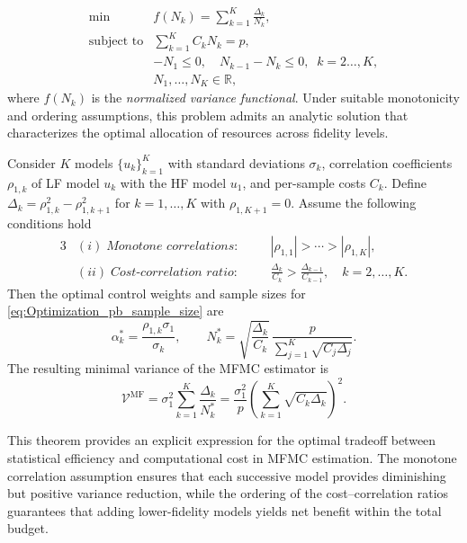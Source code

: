 %
\begin{equation}\label{eq:Optimization_pb_sample_size_reduced}
    \begin{array}{ll}
    \min &\displaystyle f(N_k) =\sum_{k=1}^K \frac{\Delta_k}{N_k},\\
       \text{subject to} &\displaystyle\sum\limits_{k=1}^K C_kN_k=p,\\[2pt]
       &\displaystyle -N_1\le 0,\quad \displaystyle N_{k-1}-N_k\le 0, \;\; k=2\ldots,K,\\
       &N_1,\ldots, N_K\in \mathbb{R},
    \end{array}
\end{equation}
%
where $f(N_k)$ is the {\it normalized variance functional}. Under suitable monotonicity and ordering assumptions, this problem admits an analytic solution that characterizes the optimal allocation of resources across fidelity levels. 


%
\begin{theorem}
\label{thm:Sample_size_est}
Consider $K$ models $\{u_{k}\}_{k=1}^K$ with standard deviations $\sigma_k$, correlation coefficients $\rho_{1,k}$ of LF model $u_k$ with the HF model $u_1$, and per-sample costs $C_k$. Define $\Delta_k = \rho_{1,k}^2 - \rho_{1,k+1}^2$ for $k = 1, \dots, K$ with $\rho_{1,K+1}=0$. Assume the following conditions hold
%
\begin{alignat*}{3}
&(i)\;\textit{Monotone correlations:} &\quad& |\rho_{1,1}| > \cdots > |\rho_{1,K}|,\\
&(ii)\;\textit{Cost-correlation ratio:} &\quad& \frac{\Delta_{k}}{C_k} > \frac{\Delta_{k-1}}{C_{k-1}}, \quad k=2,\ldots,K.
\end{alignat*}
%
Then the optimal control weights and sample sizes for \eqref{eq:Optimization_pb_sample_size} are
%
\begin{equation}\label{eq:MFMC_RealValued_Sample_Size}
    \alpha_k^* = \frac{\rho_{1,k}\sigma_1}{\sigma_k}, \qquad
    N_k^* = \sqrt{\frac{\Delta_k}{C_k}}\,
    \frac{p}{\sum_{j=1}^K \sqrt{C_j \Delta_j}}.
\end{equation}
%
%
The resulting minimal variance of the MFMC estimator is
\begin{equation}\label{eq:MFMC_variance_optimal}
\mathcal{V}^{\text{MF}}
= \sigma_1^2\sum_{k=1}^K \frac{\Delta_k}{N_k^*}=\frac{\sigma_1^2}{p}\!\left(\sum_{k=1}^K \sqrt{C_k \Delta_k}\right)^{\!2}.
\end{equation}
\end{theorem}
%
This theorem provides an explicit expression for the optimal tradeoff between statistical efficiency and computational cost in MFMC estimation. The monotone correlation assumption ensures that each successive model provides diminishing but positive variance reduction, while the ordering of the cost–correlation ratios guarantees that adding lower-fidelity models yields net benefit within the total budget. 


